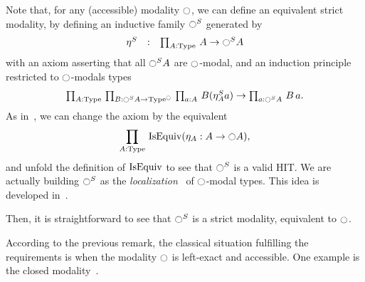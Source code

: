 \begin{rmq}
Note that, for any (accessible) modality $\ocircle$, we can define an equivalent
strict modality, by defining an inductive family $\ocircle^S$ generated by
\[ \left.
    \begin{array}{lll}
      \eta^S & : & \prod_{A:\operatorname{Type}}\, A \to \ocircle^S A \\
    \end{array}
    \right.
\]
with an axiom asserting that all $\ocircle^S A$ are $\ocircle$-modal, and
an induction principle restricted to $\ocircle$-modals types
{\large \[\textstyle{
  \prodD A \Type {%
    \prodD B {\modal^S A\to\Type^\modal}
      {\prodD a A {B(\eta^S_A a)} \to \prodD a {\modal^S A} {B\, a}%
      }%
    }%
}.\]}%
As in~\cite{shulman-localization}, we can change the axiom by the equivalent
\[
  \prod_{A:\operatorname{Type}}\, \operatorname{IsEquiv} (\eta_A : A \to \ocircle A),
\] and unfold the definition of $\operatorname{IsEquiv}$ to see that $\ocircle^S$ is a
valid HIT.
We are actually building $\ocircle^S$ as the {\em
  localization}~\cite[Definition 5.2.7.2]{lurie} of $\ocircle$-modal
types. This idea is developed in~\cite{shulman-mod-hits}.

Then, it is
straightforward to see that $\ocircle^S$ is a strict modality,
equivalent to $\ocircle$.
\end{rmq}

According to the previous remark, the classical situation fulfilling
the requirements is when the modality $\ocircle$ is left-exact and
accessible. One example is the closed
modality~\cite[Modalities/Closed.v]{hottlib}.

